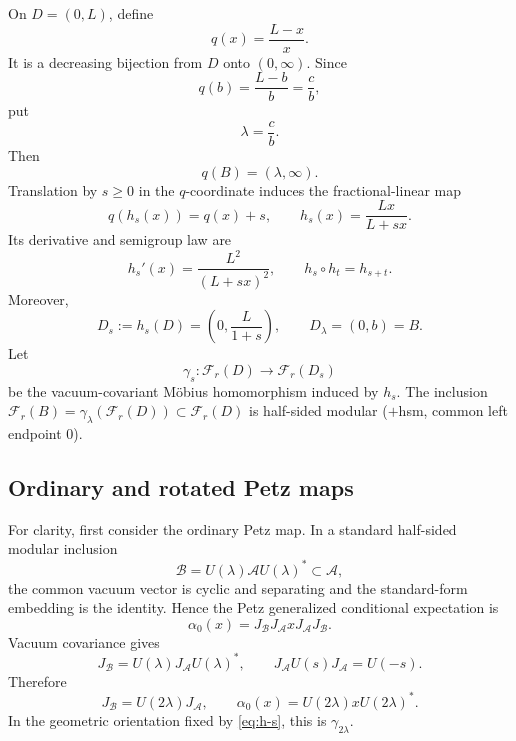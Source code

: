 \documentclass[11pt]{article}
\theoremstyle{accent}
\theoremstyle{definition}
\newcommand{\cF}{\mathcal{F}}
\newcommand{\cA}{\mathcal{A}}
\newcommand{\cB}{\mathcal{B}}
\begin{document}
On \(D=(0,L)\), define
\begin{equation}\label{eq:q-coordinate}
 q(x)=\frac{L-x}{x}.
\end{equation}
It is a decreasing bijection from \(D\) onto \((0,\infty)\).  Since
\[
 q(b)=\frac{L-b}{b}=\frac cb,
\]
put
\begin{equation}\label{eq:lambda}
 \lambda=\frac cb.
\end{equation}
Then
\[
 q(B)=(\lambda,\infty).
\]
Translation by \(s\ge0\) in the \(q\)-coordinate induces the fractional-linear map
\begin{equation}\label{eq:h-s}
 q(h_s(x))=q(x)+s,
 \qquad
 \boxed{h_s(x)=\frac{Lx}{L+sx}}.
\end{equation}
Its derivative and semigroup law are
\begin{equation}\label{eq:h-derivative-semigroup}
 h_s'(x)=\frac{L^2}{(L+sx)^2},
 \qquad
 h_s\circ h_t=h_{s+t}.
\end{equation}
Moreover,
\begin{equation}\label{eq:D-s}
 D_s:=h_s(D)=\left(0,\frac{L}{1+s}\right),
 \qquad
 D_\lambda=(0,b)=B.
\end{equation}
Let
\[
 \gamma_s:\cF_r(D)\longrightarrow\cF_r(D_s)
\]
be the vacuum-covariant M\"obius homomorphism induced by \(h_s\).  The inclusion \(\cF_r(B)=\gamma_\lambda(\cF_r(D))\subset\cF_r(D)\) is half-sided modular (\(+\)hsm, common left endpoint \(0\)).

\subsection{Ordinary and rotated Petz maps}

For clarity, first consider the ordinary Petz map.  In a standard half-sided modular inclusion
\[
 \cB=U(\lambda)\cA U(\lambda)^*\subset\cA,
\]
the common vacuum vector is cyclic and separating and the standard-form embedding is the identity.  Hence the Petz generalized conditional expectation is
\[
 \alpha_0(x)=J_{\cB}J_{\cA}xJ_{\cA}J_{\cB}.
\]
Vacuum covariance gives
\[
 J_{\cB}=U(\lambda)J_{\cA}U(\lambda)^*,
 \qquad
 J_{\cA}U(s)J_{\cA}=U(-s).
\]
Therefore
\[
 J_{\cB}=U(2\lambda)J_{\cA},
 \qquad
 \alpha_0(x)=U(2\lambda)xU(2\lambda)^*.
\]
In the geometric orientation fixed by \eqref{eq:h-s}, this is \(\gamma_{2\lambda}\).
\end{document}
